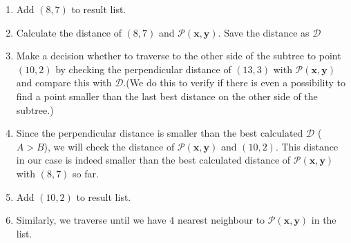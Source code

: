 \begin{mscexample}
\begin{enumerate}
    	\item Add $(8,7)$ to result list.
    	
    	\item Calculate the distance of $(8,7)$ and $\mathcal{P}(\boldsymbol{x}, \boldsymbol{y})$. Save the distance as $\mathcal{D}$
    	
    	\item Make a decision whether to traverse to the other side of the subtree to point $(10,2)$ by checking the perpendicular distance of $(13,3)$ with $\mathcal{P}(\boldsymbol{x}, \boldsymbol{y})$ and compare this with $\mathcal{D}$.(We do this to verify if there is even a possibility to find a point smaller than the last best distance on the other side of the subtree.) 
    	
    	\item Since the perpendicular distance is smaller than the best calculated $\mathcal{D}$ ($A > B$), we will check the distance of $\mathcal{P}(\boldsymbol{x}, \boldsymbol{y})$ and $(10,2)$. This distance in our case is indeed smaller than the best calculated distance of $\mathcal{P}(\boldsymbol{x}, \boldsymbol{y})$ with $(8,7)$ so far.
    	
    	\item Add $(10,2)$ to result list.
    	
    	\item Similarly, we traverse until we have $4$ nearest neighbour to $\mathcal{P}(\boldsymbol{x}, \boldsymbol{y})$ in the list.
	\end{enumerate}
\end{mscexample}
